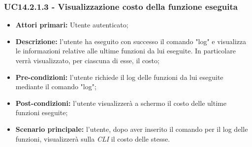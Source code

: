 \subsubsection{UC14.2.1.3 - Visualizzazione costo della funzione eseguita}
\begin{itemize}
	\item \textbf{Attori primari:} Utente autenticato;
	\item \textbf{Descrizione:} l'utente ha eseguito con successo il comando "log" e visualizza le informazioni relative alle ultime funzioni da lui eseguite. In particolare verrà visualizzato, per ciascuna di esse, il costo; 
	\item \textbf{Pre-condizioni:} l'utente richiede il log delle funzioni da lui eseguite mediante il comando "log"; 
	\item \textbf{Post-condizioni:} l'utente visualizzerà a schermo il costo delle ultime funzioni eseguite;
	\item \textbf{Scenario principale:} l'utente, dopo aver inserito il comando per il log delle funzioni, visualizzerà sulla \textit{CLI\glo} il costo delle stesse.
\end{itemize}
